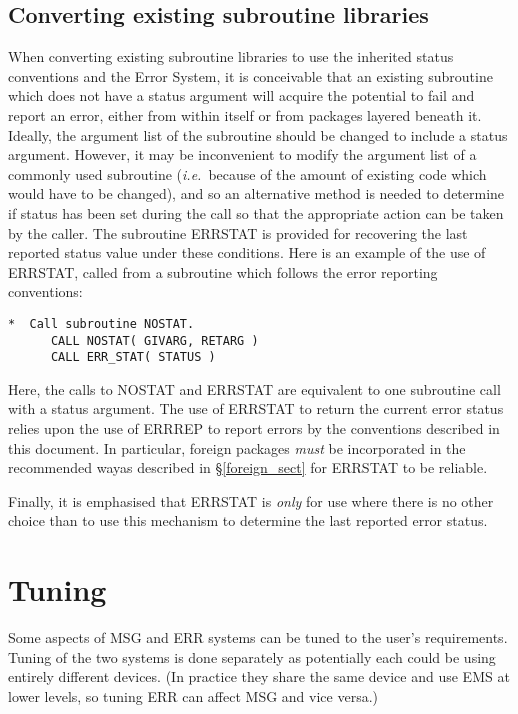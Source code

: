 \documentclass[twoside,11pt]{article}
\newcommand{\htmlref}[2]{#1}
\newcommand{\latex}[1]{#1}
\newcommand{\xlabel}[1]{}
\renewcommand{\_}{\texttt{\symbol{95}}}
\begin{document}
\subsection{\xlabel{converting_existing_subroutine_libraries}Converting existing subroutine libraries \label{convert_sect}}

When converting existing subroutine
libraries to use the inherited status conventions and the Error System,
it is conceivable that an existing subroutine which does not have a
status argument will acquire the potential to fail and report an error, either
from within itself or from packages layered beneath it.
Ideally, the argument list of the subroutine should be changed to include a
status argument.
However,
it may be inconvenient to modify the argument list of a commonly used
subroutine (\textit{i.e.}\ because of the amount of existing code which would have
to be changed), and so an alternative method is needed to determine if status
has  been set during the
call so that the appropriate action can be taken by the caller.
The subroutine ERR\_STAT is provided for recovering the last reported status
value under these conditions.
Here is an example of the use of ERR\_STAT, called from a subroutine which
follows the error reporting conventions:

\begin {small}
\begin{verbatim}
*  Call subroutine NOSTAT.
      CALL NOSTAT( GIVARG, RETARG )
      CALL ERR_STAT( STATUS )
\end{verbatim}
\end {small}

Here, the calls to NOSTAT and ERR\_STAT are equivalent to one subroutine call
with a status argument.
The use of ERR\_STAT to return the current error status relies upon the use of
ERR\_REP to report errors by the conventions described in this document.
In particular, foreign packages \emph{must} be incorporated in
\htmlref{the recommended way}{foreign_sect}\latex{as described
in \S\ref{foreign_sect}} for ERR\_STAT to be reliable.

Finally, it is emphasised that ERR\_STAT is \emph{only} for use where there is
no other choice than to use this mechanism to determine the last reported error
status.


\section{\xlabel{tuning}Tuning\label{tuning}}
Some aspects of MSG and ERR systems can be tuned to the user's requirements.
Tuning of the two systems is done separately as potentially each could
be using entirely different devices. (In practice they share the same device
and use EMS at lower levels, so tuning ERR can affect MSG and vice versa.)
\end{document}
